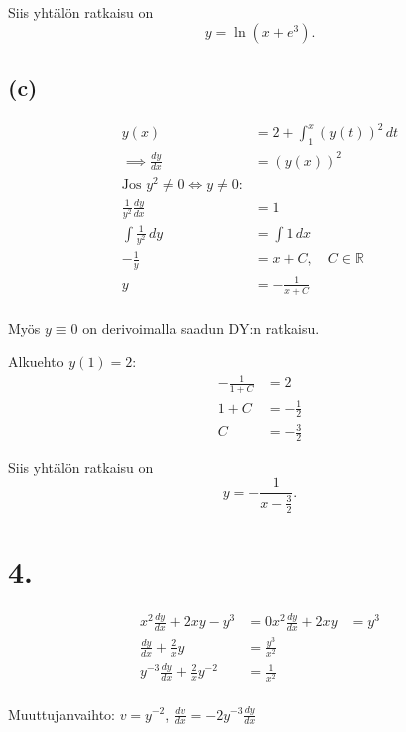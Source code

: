 \documentclass{article}
\begin{document}
Siis yhtälön ratkaisu on
\[
  y = \ln(x + e^3).
\]

\subsection*{(c)}

\begin{align*}
  y(x) &= 2 + \int_1^x (y(t))^2\,dt \\
  \implies \frac{dy}{dx} &= (y(x))^2 \\
  \text{Jos $y^2 \neq 0 \iff y \neq 0$:} \\
  \frac{1}{y^2}\frac{dy}{dx} &= 1 \\
  \int \frac{1}{y^2}\,dy &= \int 1\,dx \\
  -\frac{1}{y} &= x + C, \quad C \in \mathbb{R} \\
  y &= -\frac{1}{x + C} \\
\end{align*}

Myös $y \equiv 0$ on derivoimalla saadun DY:n ratkaisu.

Alkuehto $y(1) = 2$:
\begin{align*}
  -\frac{1}{1 + C} &= 2 \\
  1 + C &= -\frac{1}{2} \\
  C &= -\frac{3}{2}
\end{align*}

Siis yhtälön ratkaisu on
\[
  y = -\frac{1}{x - \frac{3}{2}}.
\]

\section*{4.}

\begin{align*}
  x^2\frac{dy}{dx} + 2xy - y^3 &= 0
  x^2\frac{dy}{dx} + 2xy &= y^3 \\
  \frac{dy}{dx} + \frac{2}{x}y &= \frac{y^3}{x^2} \\
  y^{-3}\frac{dy}{dx} + \frac{2}{x}y^{-2} &= \frac{1}{x^2} \\
\end{align*}

Muuttujanvaihto: $v = y^{-2}$, $\frac{dv}{dx} = -2y^{-3}\frac{dy}{dx}$
\end{document}
